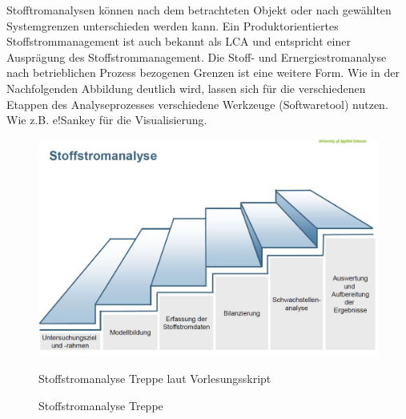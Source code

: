 \documentclass[a4paper, 12pt, twoside, BCOR=20mm, DIV=calc, abstracton, parskip=half*, toc=bibliography, toc=listof, headsepline, footsepline, headings=small, numbers=enddot]{scrreprt}
\begin{document}
Stofftromanalysen können nach dem betrachteten Objekt oder nach gewählten Systemgrenzen unterschieden werden kann. Ein Produktorientiertes Stoffstrommanagement ist auch bekannt als \ac{LCA} und entspricht einer Ausprägung des Stoffstrommanagement. Die Stoff- und Ernergiestromanalyse nach betrieblichen Prozess bezogenen Grenzen ist eine weitere Form. Wie in der Nachfolgenden Abbildung deutlich wird, lassen sich für die verschiedenen Etappen des Analyseprozesses verschiedene Werkzeuge (Softwaretool) nutzen. Wie z.B. e!Sankey für die Visualisierung.
\begin{figure}
\centering	
\includegraphics{Bild/Stoffstromanalyse.jpg}
\caption{Stoffstromanalyse Treppe}{Stoffstromanalyse Treppe laut Vorlesungsskript\cite{SAPSkript2011}}
\end{figure}
\end{document}

